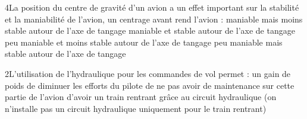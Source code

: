 {4}{La position du centre de gravité d'un avion a un effet important sur la stabilité et la maniabilité de l'avion, un centrage avant rend l'avion :	}
{maniable mais moins stable autour de l'axe de tangage}
{maniable et stable autour de l'axe de tangage}
{peu maniable et moins stable autour de l'axe de tangage}
{peu maniable mais stable autour de l'axe de tangage} 
{}

{2}{L'utilisation de l'hydraulique pour les commandes de vol permet :}
{un gain de poids}
{de diminuer les efforts du pilote}
{de ne pas avoir de maintenance sur cette partie de l'avion}
{d'avoir un train rentrant grâce au circuit hydraulique (on n'installe pas un circuit hydraulique uniquement pour le train rentrant)}  
{}
 
 
 


